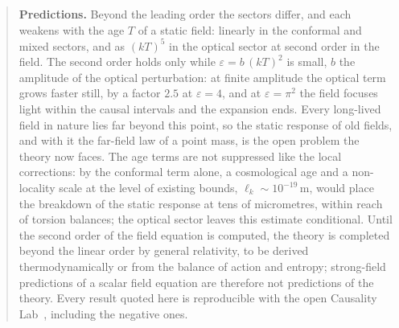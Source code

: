 \begin{abstract}
\smallskip\noindent
\textbf{Predictions.} Beyond the leading order the sectors differ, and each weakens with the age $T$ of a
static field: linearly in the conformal and mixed sectors, and as $(kT)^5$ in the optical sector at second
order in the field. The second order holds only while $\varepsilon=b\,(kT)^2$ is small, $b$ the amplitude of the
optical perturbation: at finite amplitude the optical term grows faster still, by a factor $2.5$ at
$\varepsilon=4$, and at $\varepsilon=\pi^2$ the field focuses light within the causal intervals and the expansion
ends. Every long-lived field in nature lies far beyond this point, so the static response of old fields, and with
it the far-field law of a point mass, is the open problem the theory now faces. The age terms are not suppressed
like the local corrections: by the conformal term alone, a cosmological age and a non-locality scale at the level
of existing bounds, $\ell_k\sim10^{-19}$\,m, would place the breakdown of the static response at tens of
micrometres, within reach of torsion balances; the optical sector leaves this estimate conditional. Until the
second order of the field equation is computed, the theory is completed beyond the linear order by general
relativity, to be derived thermodynamically or from the balance of action and entropy; strong-field predictions of a scalar field equation are therefore not
predictions of the theory. Every result quoted here is reproducible with the open Causality
Lab~\cite{CausalityLab}, including the negative ones.
\end{abstract}
